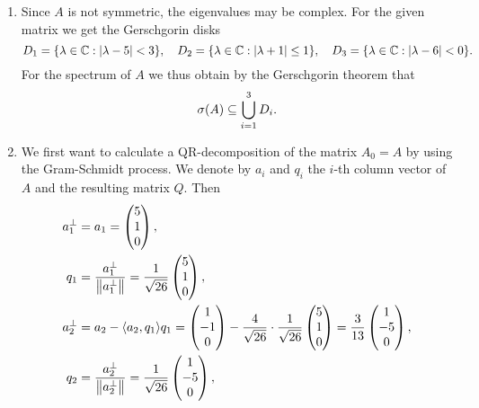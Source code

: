 \documentclass{exercise}
\begin{document}
	\begin{enumerate}
		\item Since \(A\) is not symmetric, the eigenvalues may be complex.
		For the given matrix we get the Gerschgorin disks
		\[
			D_1 = \braces*{\lambda \in \C : \absolute*{\lambda - 5} < 3}, \quad D_2 = \braces*{\lambda \in \C : \absolute*{\lambda + 1} \le 1}, \quad D_3 = \braces*{\lambda \in \C : \absolute*{\lambda - 6} < 0}.
		\]
		For the spectrum of \(A\) we thus obtain by the Gerschgorin theorem that
		\[
			\sigma\parentheses*{A} \subseteq \bigcup_{i = 1}^3 D_i.
		\]

		\item We first want to calculate a QR-decomposition of the matrix \(A_0 = A\) by using the Gram-Schmidt process.
		We denote by \(a_i\) and \(q_i\) the \(i\)-th column vector of \(A\) and the resulting matrix \(Q\). Then
		\begin{align*}
			a_1^\bot &= a_1 = \begin{pmatrix}
				5\\
				1\\
				0
			\end{pmatrix},\\
			q_1 &= \frac{a_1^\bot}{\norm*{a_1^\bot}} = \frac{1}{\sqrt{26}}\begin{pmatrix}
				5\\
				1\\
				0
			\end{pmatrix},\\
			a_2^\bot &= a_2 - \angles*{a_2, q_1}q_1 = \begin{pmatrix}
				1\\
				-1\\
				0
			\end{pmatrix} - \frac{4}{\sqrt{26}} \cdot \frac{1}{\sqrt{26}}\begin{pmatrix}
				5\\
				1\\
				0
			\end{pmatrix} = \frac{3}{13}\begin{pmatrix}
				1\\
				-5\\
				0
			\end{pmatrix},\\
			q_2 &= \frac{a_2^\bot}{\norm*{a_2^\bot}} = \frac{1}{\sqrt{26}}\begin{pmatrix}
				1\\
				-5\\
				0
			\end{pmatrix},\\

\end{align*}
\end{enumerate}
\end{document}
